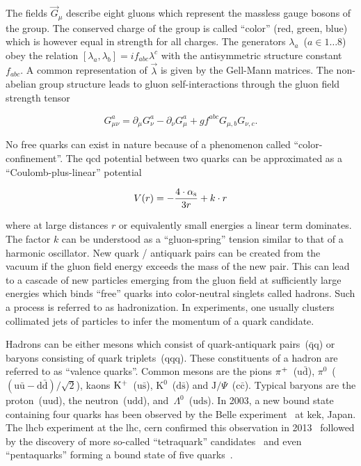 The fields $\vec{G}_\mu$ describe eight gluons which represent the massless gauge bosons of the group. The conserved charge of the group is called ``color'' (red, green, blue) which is however equal in strength for all charges. The generators $\lambda_a$~($a\in{1\ldots8}$) obey the relation $[\lambda_a,\lambda_b]=if_{abc}\lambda^c$ with the antisymmetric structure constant $f_{abc}$. A common representation of $\vec{\lambda}$ is given by the Gell-Mann matrices. The non-abelian group structure leads to gluon self-interactions through the gluon field strength tensor

\begin{equation}
G_{\mu\nu}^{a}=\partial_{\mu} G_\nu^{a}-\partial_{\nu} G_{\mu}^{a}+gf^{abc}G_{\mu,b}G_{\nu,c}.
\end{equation}

No free quarks can exist in nature because of a phenomenon called ``color-confinement''. The \gls{qcd} potential between two quarks can be approximated as a ``Coulomb-plus-linear'' potential~\cite{Sumino2003173}

\begin{equation}
V(r)=-\frac{4\cdot{\alpha_\mathrm{s}}}{3r}+k\cdot r
\end{equation}

where at large distances $r$ or equivalently small energies a linear term dominates. The factor $k$ can be understood as a ``gluon-spring'' tension similar to that of a harmonic oscillator. New quark / antiquark pairs can be created from the vacuum if the gluon field energy exceeds the mass of the new pair. This can lead to a cascade of new particles emerging from the gluon field at sufficiently large energies which binds ``free'' quarks into color-neutral singlets called hadrons. Such a process is referred to as hadronization. In experiments, one usually clusters collimated jets of particles to infer the momentum of a quark candidate.

Hadrons can be either mesons which consist of quark-antiquark pairs~($\bar{\mathrm{q}}\mathrm{q}$) or baryons consisting of quark triplets~($\mathrm{qqq}$). These constituents of a hadron are referred to as ``valence quarks''. Common mesons are the pions $\pi^{+}$~($\mathrm{u}\bar{\mathrm{d}}$), $\pi^{0}$~($(\mathrm{u}\bar{\mathrm{u}}-\mathrm{d}\bar{\mathrm{d}})/\sqrt{2}$), kaons $\mathrm{K}^{+}$~($\mathrm{u}\bar{\mathrm{s}}$), $\mathrm{K}^{0}$~($\mathrm{d}\bar{\mathrm{s}}$) and $\mathrm{J}/\Psi$~($\mathrm{c}\bar{\mathrm{c}}$). Typical baryons are the proton~($\mathrm{uud}$), the neutron~($\mathrm{udd}$), and~$\Lambda^{0}$~($\mathrm{uds}$). In 2003, a new bound state containing four quarks has been observed by the Belle experiment~\cite{PhysRevLett.91.262001} at \gls{kek}, Japan. The \gls{lhcb} experiment at the \gls{lhc}, \gls{cern} confirmed this observation in 2013~\cite{Aaij:2013zoa} followed by the discovery of more so-called ``tetraquark'' candidates~\cite{Aaij:2014jqa,Aaij:2016iza} and even ``pentaquarks'' forming a bound state of five quarks~\cite{Aaij:2015tga}.

